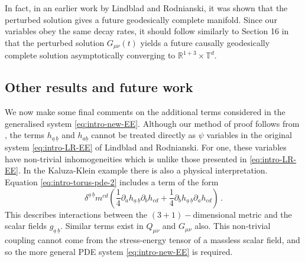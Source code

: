 \documentclass[11pt, a4paper]{amsart}
\numberwithin{equation}{section}
\numberwithin{theorem}{section}
\newcommand{\R}{\mathbb{R}}
\newcommand{\p}{\partial}
\newcommand{\mn}{{\mu \nu}}
\newcommand{\tee}{{\mathbb{T}^d}}
\newcommand{\bbar}{{\underline{b}}}
\newcommand{\abbar}{{\underline{a} \, \underline{b}}}
\begin{document}
In fact, in an earlier work by Lindblad and Rodnianski, it was shown that the perturbed solution gives a future geodesically complete manifold. 
Since our variables obey the same decay rates, it should follow similarly to Section 16 in \cite{Lindblad:2003hw} that the perturbed solution $G_\mn(t)$ yields a future causally geodesically complete solution asymptotically converging to $\R^{1+3} \times \tee$.\\

\subsection{Other results and future work}
We now make some final comments on the additional terms considered in the generalised system \eqref{eq:intro-new-EE}. Although our method of proof follows from \cite{LR:04}, the terms $h_\abbar$ and $h_{a \bbar}$ cannot be treated directly as $\psi$ variables in the original system \eqref{eq:intro-LR-EE} of Lindblad and Rodnianski. 
For one, these variables have non-trivial inhomogeneities which is unlike those presented in \eqref{eq:intro-LR-EE}. In the Kaluza-Klein example there is also a physical interpretation. Equation \eqref{eq:intro-torus-pde-2} includes a term of the form
$$ \delta^\abbar m^{cd} \left( \frac{1}{4}  \p_a h_\abbar\p_b h_{cd} + \frac{1}{4}  \p_b h_\abbar \p_a h_{cd} \right) \,.$$
This describes interactions between the $(3+1)-$dimensional metric and the scalar fields $g_\abbar$. Similar terms exist in $Q_\mn$ and $G_\mn$ also. This non-trivial coupling cannot come from the stress-energy tensor of a massless scalar field, and so the more general PDE system \eqref{eq:intro-new-EE} is required. 
\end{document}
